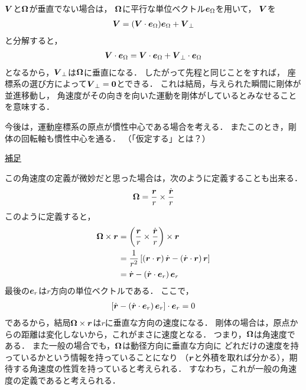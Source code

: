 \documentclass[a4paper]{jsarticle}
\def\vec#1{\mbox{\boldmath $#1$}}
\begin{document}
$\vec{V}$と$\vec{\Omega}$が垂直でない場合は，
$\vec{\Omega}$に平行な単位ベクトル$\vec{e}_{\Omega}$を用いて，
$\vec{V}$を
\begin{align}
	\vec{V} = ( \vec{V} \cdot \vec{e}_{\Omega}) \vec{e}_{\Omega}
	+ \vec{V}_{\perp}
\end{align}
と分解すると，
\begin{align}
	\vec{V} \cdot \vec{e}_{\Omega} = \vec{V} \cdot \vec{e}_{\Omega}
	+ \vec{V}_{\perp} \cdot \vec{e}_{\Omega}
\end{align}
となるから，$\vec{V}_{\perp}$は$\vec{\Omega}$に垂直になる．
したがって先程と同じことをすれば，
座標系の選び方によって$\vec{V}_{\perp}=\vec{0}$とできる．
これは結局，与えられた瞬間に剛体が並進移動し，
角速度がその向きを向いた運動を剛体がしているとみなせることを意味する．

今後は，運動座標系の原点が慣性中心である場合を考える．
またこのとき，剛体の回転軸も慣性中心を通る．
（「仮定する」とは？）

\begin{screen}
	\underline{補足}

	この角速度の定義が微妙だと思った場合は，次のように定義することも出来る．
	\begin{align}
		\vec{\Omega} = \frac{\vec{r}}{r} \times \frac{\dot{\vec{r}}}{r}
	\end{align}
	このように定義すると，
	\begin{align}
		\vec{\Omega} \times \vec{r} &= \left(
			\frac{\vec{r}}{r} \times \frac{\dot{\vec{r}}}{r}
		\right) \times \vec{r} \\
		&= \frac{1}{r^2} \left[
			\left( \vec{r} \cdot \vec{r} \right) \dot{\vec{r}}
			- \left( \dot{\vec{r}} \cdot \vec{r} \right) \vec{r}
		\right] \\
		&= \dot{\vec{r}} -
		\left( \dot{\vec{r}} \cdot \vec{e}_{r} \right) \vec{e}_r
	\end{align}
	最後の$\vec{e}_r$は$r$方向の単位ベクトルである．
	ここで，
	\begin{align}
		\left[
			\dot{\vec{r}} -
			\left( \dot{\vec{r}} \cdot \vec{e}_r \right)\vec{e}_r
		\right] \cdot \vec{e}_r
		= 0
	\end{align}
	であるから，結局$\vec{\Omega} \times \vec{r}$は$r$に垂直な方向の速度になる．
	剛体の場合は，原点からの距離は変化しないから，これがまさに速度となる．
	つまり，$\vec{\Omega}$は角速度である．
	また一般の場合でも，$\vec{\Omega}$は動径方向に垂直な方向に
	どれだけの速度を持っているかという情報を持っていることになり
	（$\vec{r}$と外積を取れば分かる），期待する角速度の性質を持っていると考えられる．
	すなわち，これが一般の角速度の定義であると考えられる．
\end{screen}
\end{document}
